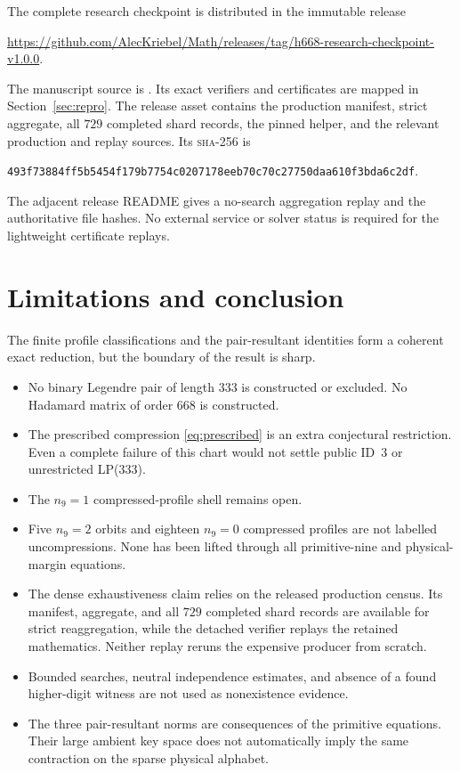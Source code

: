 \documentclass[11pt]{article}
\theoremstyle{remark}
\newcommand{\sha}{\textsc{sha-256}}
\begin{document}
The complete research checkpoint is distributed in the immutable release
\begin{center}
\url{https://github.com/AlecKriebel/Math/releases/tag/h668-research-checkpoint-v1.0.0}.
\end{center}
The manuscript source is
.
Its exact verifiers and certificates are mapped in
Section~\ref{sec:repro}.  The release asset
contains the production manifest, strict aggregate, all $729$ completed
shard records, the pinned helper, and the relevant production and replay
sources.  Its \sha{} is
\begin{center}
\texttt{493f73884ff5b5454f179b7754c0207178eeb70c70c27750daa610f3bda6c2df}.
\end{center}
The adjacent release README gives a no-search aggregation replay and the
authoritative file hashes.  No external service or solver status is
required for the lightweight certificate replays.

\section{Limitations and conclusion}

The finite profile classifications and the pair-resultant identities form
a coherent exact reduction, but the boundary of the result is sharp.

\begin{itemize}
\item No binary Legendre pair of length $333$ is constructed or excluded.
No Hadamard matrix of order $668$ is constructed.
\item The prescribed compression \eqref{eq:prescribed} is an extra
conjectural restriction.  Even a complete failure of this chart would not
settle public ID~3 or unrestricted LP(333).
\item The $n_9=1$ compressed-profile shell remains open.
\item Five $n_9=2$ orbits and eighteen $n_9=0$ compressed profiles are not
labelled uncompressions.  None has been lifted through all primitive-nine
and physical-margin equations.
\item The dense exhaustiveness claim relies on the released production
census.  Its manifest, aggregate, and all $729$ completed shard records are
available for strict reaggregation, while the detached verifier replays the
retained mathematics.  Neither replay reruns the expensive producer from
scratch.
\item Bounded searches, neutral independence estimates, and absence of a
found higher-digit witness are not used as nonexistence evidence.
\item The three pair-resultant norms are consequences of the primitive
equations.  Their large ambient key space does not automatically imply the
same contraction on the sparse physical alphabet.
\end{itemize}
\end{document}
